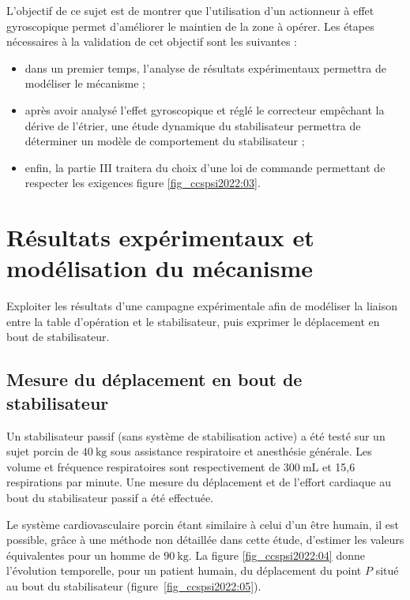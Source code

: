 \begin{obj}
L'objectif de ce sujet est de montrer que l'utilisation d'un actionneur à effet gyroscopique permet d'améliorer le maintien de la zone à opérer. Les étapes nécessaires à la validation de cet objectif sont les suivantes :
\end{obj}

\begin{itemize}
  \item dans un premier temps, l'analyse de résultats expérimentaux permettra de modéliser le mécanisme ;

  \item après avoir analysé l'effet gyroscopique et réglé le correcteur empêchant la dérive de l'étrier, une étude dynamique du stabilisateur permettra de déterminer un modèle de comportement du stabilisateur ;

  \item enfin, la partie III traitera du choix d'une loi de commande permettant de respecter les exigences figure \ref{fig_ccspsi2022:03}.

\end{itemize}
\fi

\section{Résultats expérimentaux et modélisation du mécanisme}
\begin{obj}
Exploiter les résultats d'une campagne expérimentale afin de modéliser la liaison entre la table d'opération et le stabilisateur, puis exprimer le déplacement en bout de stabilisateur.
\end{obj}

\ifprof
\else
\subsection{\label{sec:I.A} Mesure du déplacement en bout de stabilisateur}
Un stabilisateur passif (sans système de stabilisation active) a été testé sur un sujet porcin de $40 \mathrm{~kg}$ sous assistance respiratoire et anesthésie générale. Les volume et fréquence respiratoires sont respectivement de $300 \mathrm{~mL}$ et 15,6 respirations par minute. Une mesure du déplacement et de l'effort cardiaque au bout du stabilisateur passif a été effectuée.

Le système cardiovasculaire porcin étant similaire à celui d'un être humain, il est possible, grâce à une méthode non détaillée dans cette étude, d'estimer les valeurs équivalentes pour un homme de $90 \mathrm{~kg}$. La figure \ref{fig_ccspsi2022:04} donne l'évolution temporelle, pour un patient humain, du déplacement du point $P$ situé au bout du stabilisateur (figure~\ref{fig_ccspsi2022:05}).

